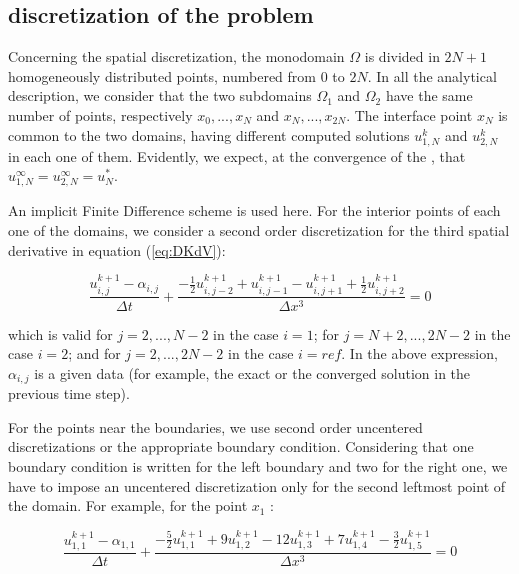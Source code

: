 \subsection{ discretization of the problem}

\indent Concerning the spatial discretization, the monodomain $\Omega$ is divided in $2N + 1$ homogeneously distributed points, numbered from $0$ to $2N$. In all the analytical description, we consider that the two subdomains $\Omega_1$ and $\Omega_2$ have the same number of points, respectively $x_0,...,x_N$ and $x_N,...,x_{2N}$. The interface point $x_N$ is common to the two domains, having different computed solutions $u_{1,N}^k$ and $u_{2,N}^k$ in each one of them. Evidently, we expect, at the convergence of the , that $u_{1,N}^\infty = u_{2,N}^\infty = u_N^*$.

\indent An implicit Finite Difference scheme is used here. For the interior points of each one of the domains, we consider a second order discretization for the third spatial derivative in equation (\ref{eq:DKdV}):

\begin{equation}
    \label{eq:FDdiscretization}
    \frac{u^{k+1}_{i,j} - \alpha_{i,j}}{\Delta t} + \frac{-\frac{1}{2}u_{i,j-2}^{k+1} + u_{i,j-1}^{k+1} - u_{i,j+1}^{k+1} + \frac{1}{2}u_{i,j+2}^{k+1} }{\Delta x ^3} = 0
\end{equation}

\noindent which is valid for $j=2,...,N-2$ in the case $i=1$; for $j=N+2,...,2N-2$ in the case $i=2$; and for $j=2,...,2N-2$ in the case $i=ref$. In the above expression, $\alpha_{i,j}$ is a given data (for example, the exact or the converged solution in the previous time step).

\indent For the points near the boundaries, we use second order uncentered discretizations or the appropriate boundary condition. Considering that one boundary condition is written for the left boundary and two for the right one, we have to impose an uncentered discretization only for the second leftmost point of the domain. For example, for the point $x_1$ : 

\begin{equation*}
    \frac{u_{1,1}^{k+1} - \alpha_{1,1}}{\Delta t} + \frac{-\frac{5}{2}u_{1,1}^{k+1} + 9u_{1,2}^{k+1} - 12 u_{1,3}^{k+1} + 7 u_{1,4}^{k+1} -\frac{3}{2}u_{1,5}^{k+1}}{\Delta x ^3} = 0
\end{equation*}

